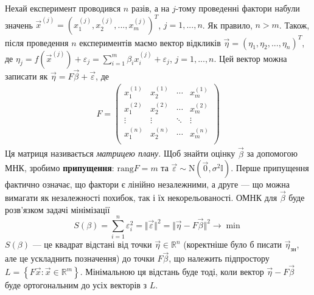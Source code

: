 Нехай експеримент проводився $n$ разів, а на $j$-тому проведенні фактори набули значень
$\vec{x}^{(j)} = \left(x_1^{(j)}, x_2^{(j)}, ..., x_m^{(j)}\right)^T$, $j=1,...,n$. Як правило, $n > m$.
Також, після проведення $n$ експериментів маємо вектор відкликів
$\vec{\eta} = \left(\eta_1, \eta_2, ..., \eta_n\right)^T$, де
$\eta_j = f\left(\vec{x}^{(j)}\right) + \varepsilon_j = \sum\limits_{i=1}^m \beta_i x_i^{(j)} + \varepsilon_j$, $j=1,...,n$.
Цей вектор можна записати як $\vec{\eta} = F\vec{\beta} + \vec{\varepsilon}$, де
\begin{gather}
    F = \begin{pmatrix}
        x_1^{(1)} & x_2^{(1)} & \cdots & x_m^{(1)} \\
        x_1^{(2)} & x_2^{(2)} & \cdots & x_m^{(2)} \\
        \vdots & \vdots & \ddots & \vdots \\
        x_1^{(n)} & x_2^{(n)} & \cdots & x_m^{(n)} \\
    \end{pmatrix}
\end{gather}
Ця матриця називається \emph{матрицею плану}. Щоб знайти оцінку $\vec{\beta}$ за допомогою МНК,
зробимо \textbf{припущення}: $\mathrm{rang}{F} = m$ та $\vec{\varepsilon} \sim \mathrm{N}(\vec{0}, \sigma^2 \mathbb{I})$.
Перше припущення фактично означає, що фактори є лінійно незалежними, а друге --- що можна вимагати як незалежності похибок,
так і їх некорельованості. 
ОМНК для $\vec{\beta}$ буде розв'язком задачі мінімізації 
$$S(\beta) = \sum\limits_{i=1}^n \varepsilon_i^2 = \Vert\vec{{\varepsilon}}\Vert^2 = 
\Vert \vec{\eta} - F \vec{\beta} \Vert^2 \to \min$$
$S(\beta)$ --- це квадрат відстані від точки $\vec{\eta} \in \mathbb{R}^n$ (коректніше було б писати $\vec{\eta}_\text{зн}$,
але це ускладнить позначення) до точки $F\vec{\beta}$, що належить підпростору 
$L = \left\{F \vec{x} : \vec{x} \in \mathbb{R}^m \right\}$.
Мінімальною ця відстань буде тоді, коли вектор $\vec{\eta} - F\vec{\beta}$ буде ортогональним
до усіх векторів з $L$.
\begin{center}
\end{center}
